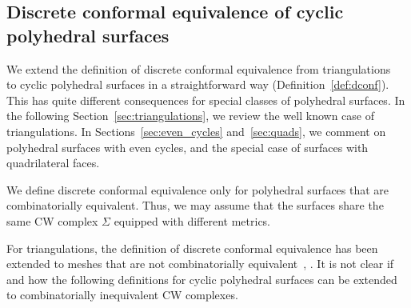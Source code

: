 \documentclass[Thesis]{subfiles}
\begin{document}
\subsection{Discrete conformal equivalence of cyclic polyhedral surfaces}
\label{sec:discr-conf-equiv}

We extend the definition of discrete conformal equivalence from
triangulations~\cite{Luo2004,Bobenko2010} to cyclic
polyhedral surfaces in a straightforward way
(Definition~\ref{def:dconf}). This has quite different consequences
for special classes of polyhedral surfaces. In the following
Section~\ref{sec:triangulations}, we review the well known case of
triangulations. In Sections~\ref{sec:even_cycles} and~\ref{sec:quads},
we comment on polyhedral surfaces with even cycles, and the special
case of surfaces with quadrilateral faces.

We define discrete conformal equivalence only for polyhedral surfaces
that are combinatorially equivalent. Thus, we may assume that the
surfaces share the same CW complex $\Sigma$ equipped with different
metrics.

\begin{remark}
  For triangulations, the definition of discrete conformal equivalence
  has been extended to meshes that are not combinatorially
  equivalent~\cite[Defintion 5.1.4]{Bobenko2010},
  \cite{Luo13, Luo14}. It is not
  clear if and how the following definitions for cyclic polyhedral
  surfaces can be extended to combinatorially inequivalent CW
  complexes.
\end{remark}
\end{document}
